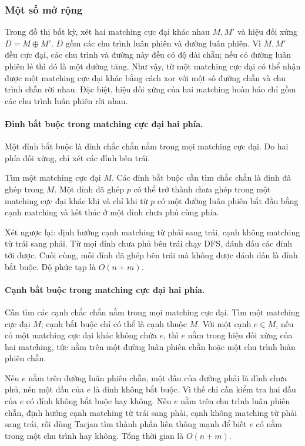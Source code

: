 \documentclass[11pt]{article}
\begin{document}
\subsubsection{Một số mở rộng}

Trong đồ thị bất kỳ, xét hai matching cực đại khác nhau \(M,M'\) và hiệu đối
xứng \(D=M\oplus M'\). \(D\) gồm các chu trình luân phiên và đường luân phiên.
Vì \(M,M'\) đều cực đại, các chu trình và đường này đều có độ dài chẵn; nếu có
đường luân phiên lẻ thì đó là một đường tăng. Như vậy, từ một matching cực đại
có thể nhận được một matching cực đại khác bằng cách xor với một số đường chẵn
và chu trình chẵn rời nhau. Đặc biệt, hiệu đối xứng của hai matching hoàn hảo
chỉ gồm các chu trình luân phiên rời nhau.

\paragraph{Đỉnh bắt buộc trong matching cực đại hai phía.}
Một đỉnh bắt buộc là đỉnh chắc chắn nằm trong mọi matching cực đại. Do hai phía
đối xứng, chỉ xét các đỉnh bên trái.

Tìm một matching cực đại \(M\). Các đỉnh bắt buộc cần tìm chắc chắn là đỉnh đã
ghép trong \(M\). Một đỉnh đã ghép \(p\) có thể trở thành chưa ghép trong một
matching cực đại khác khi và chỉ khi từ \(p\) có một đường luân phiên bắt đầu
bằng cạnh matching và kết thúc ở một đỉnh chưa phủ cùng phía.

Xét ngược lại: định hướng cạnh matching từ phải sang trái, cạnh không matching
từ trái sang phải. Từ mọi đỉnh chưa phủ bên trái chạy DFS, đánh dấu các đỉnh
tới được. Cuối cùng, mỗi đỉnh đã ghép bên trái mà không được đánh dấu là đỉnh
bắt buộc. Độ phức tạp là \(O(n+m)\).

\paragraph{Cạnh bắt buộc trong matching cực đại hai phía.}
Cần tìm các cạnh chắc chắn nằm trong mọi matching cực đại. Tìm một matching cực
đại \(M\); cạnh bắt buộc chỉ có thể là cạnh thuộc \(M\). Với một cạnh
\(e\in M\), nếu có một matching cực đại khác không chứa \(e\), thì \(e\) nằm
trong hiệu đối xứng của hai matching, tức nằm trên một đường luân phiên chẵn
hoặc một chu trình luân phiên chẵn.

Nếu \(e\) nằm trên đường luân phiên chẵn, một đầu của đường phải là đỉnh chưa
phủ, nên một đầu của \(e\) là đỉnh không bắt buộc. Vì thế chỉ cần kiểm tra hai
đầu của \(e\) có đỉnh không bắt buộc hay không. Nếu \(e\) nằm trên chu trình
luân phiên chẵn, định hướng cạnh matching từ trái sang phải, cạnh không matching
từ phải sang trái, rồi dùng Tarjan tìm thành phần liên thông mạnh để biết \(e\)
có nằm trong một chu trình hay không. Tổng thời gian là \(O(n+m)\).
\end{document}
